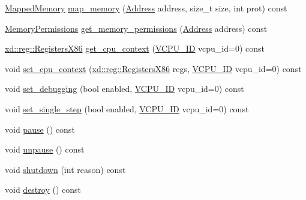 \begin{DoxyCompactItemize}
\item 
\mbox{\hyperlink{namespacexd_1_1xen_ac9cd783e07e8d847ac0805eec3536746}{Mapped\+Memory}} \mbox{\hyperlink{classxd_1_1xen_1_1_domain_a3ea03288d59c90e019647fddfdc245f5}{map\+\_\+memory}} (\mbox{\hyperlink{namespacexd_1_1xen_a94a8d6c9448e8330c771c100dba152c3}{Address}} address, size\+\_\+t size, int prot) const
\item 
\mbox{\hyperlink{structxd_1_1xen_1_1_memory_permissions}{Memory\+Permissions}} \mbox{\hyperlink{classxd_1_1xen_1_1_domain_a81189dd159d58f9f5605de0fb7d5dc58}{get\+\_\+memory\+\_\+permissions}} (\mbox{\hyperlink{namespacexd_1_1xen_a94a8d6c9448e8330c771c100dba152c3}{Address}} address) const
\item 
\mbox{\hyperlink{namespacexd_1_1reg_a0c10a4d10e689bc16f6f1a8feb4fb9b8}{xd\+::reg\+::\+Registers\+X86}} \mbox{\hyperlink{classxd_1_1xen_1_1_domain_a84aa03ff405043dd90e5102a42274a2b}{get\+\_\+cpu\+\_\+context}} (\mbox{\hyperlink{namespacexd_1_1xen_ac71045dda8a7d9d6fd0d7643001bb14e}{V\+C\+P\+U\+\_\+\+ID}} vcpu\+\_\+id=0) const
\item 
void \mbox{\hyperlink{classxd_1_1xen_1_1_domain_a001722741a173b6a6c1ed8c89b8ee131}{set\+\_\+cpu\+\_\+context}} (\mbox{\hyperlink{namespacexd_1_1reg_a0c10a4d10e689bc16f6f1a8feb4fb9b8}{xd\+::reg\+::\+Registers\+X86}} regs, \mbox{\hyperlink{namespacexd_1_1xen_ac71045dda8a7d9d6fd0d7643001bb14e}{V\+C\+P\+U\+\_\+\+ID}} vcpu\+\_\+id=0) const
\item 
void \mbox{\hyperlink{classxd_1_1xen_1_1_domain_aa4f3feaa204170aa110e9e339c68817d}{set\+\_\+debugging}} (bool enabled, \mbox{\hyperlink{namespacexd_1_1xen_ac71045dda8a7d9d6fd0d7643001bb14e}{V\+C\+P\+U\+\_\+\+ID}} vcpu\+\_\+id=0) const
\item 
void \mbox{\hyperlink{classxd_1_1xen_1_1_domain_ac877c43e5572916307dda8d591323541}{set\+\_\+single\+\_\+step}} (bool enabled, \mbox{\hyperlink{namespacexd_1_1xen_ac71045dda8a7d9d6fd0d7643001bb14e}{V\+C\+P\+U\+\_\+\+ID}} vcpu\+\_\+id=0) const
\item 
void \mbox{\hyperlink{classxd_1_1xen_1_1_domain_ac06b17738ec10f533941f26f13082f42}{pause}} () const
\item 
void \mbox{\hyperlink{classxd_1_1xen_1_1_domain_a8fc0a38d040a20073eacfaf7f4c9145f}{unpause}} () const
\item 
void \mbox{\hyperlink{classxd_1_1xen_1_1_domain_a1c5f58120120c4409d7ef908dfcef874}{shutdown}} (int reason) const
\item 
void \mbox{\hyperlink{classxd_1_1xen_1_1_domain_aac7b9eafdc784bfa43c924cd6fa84d7e}{destroy}} () const
\end{DoxyCompactItemize}


